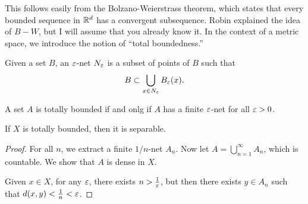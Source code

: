 \documentclass[10pt, twoside]{article}
\begin{document}
    This follows easily from the Bolzano-Weierstrass theorem, which states that
    every bounded sequence in $\mathbb{R}^d$ has a convergent subsequence. Robin
    explained the idea of $B-W$, but I will assume that you already know it. In
    the context of a metric space, we introduce the notion of ``total
    boundedness.''

    \begin{defn}[$\ep$-net] Given a set $B$, an $\ep$-net $N_{\varepsilon}$ is a subset
        of points of $B$ such that \[B \subset \bigcup_{x \in N_{\varepsilon}}
        B_{\varepsilon}(x).\] \end{defn}

    \begin{defn} A set $A$ is totally bounded if and onlg if
    $A$ has a finite $\ep$-net for all $\varepsilon > 0$.  \end{defn}

    \begin{lem} If $X$ is totally bounded, then it is separable.  \begin{proof}
        For all $n$, we extract a finite $1/n$-net $A_n$. Now let $A =
        \bigcup_{n=1}^{\infty} A_n$, which is countable. We show that $A$ is
        dense in $X$.

            Given $x \in X$, for any $\ep$, there exists $n > \frac{1}{\varepsilon}$,
        but then there exists $y \in A_n$ such that $d(x,y) < \frac{1}{n} <
    \varepsilon$.  \end{proof} \end{lem}
\end{document}
